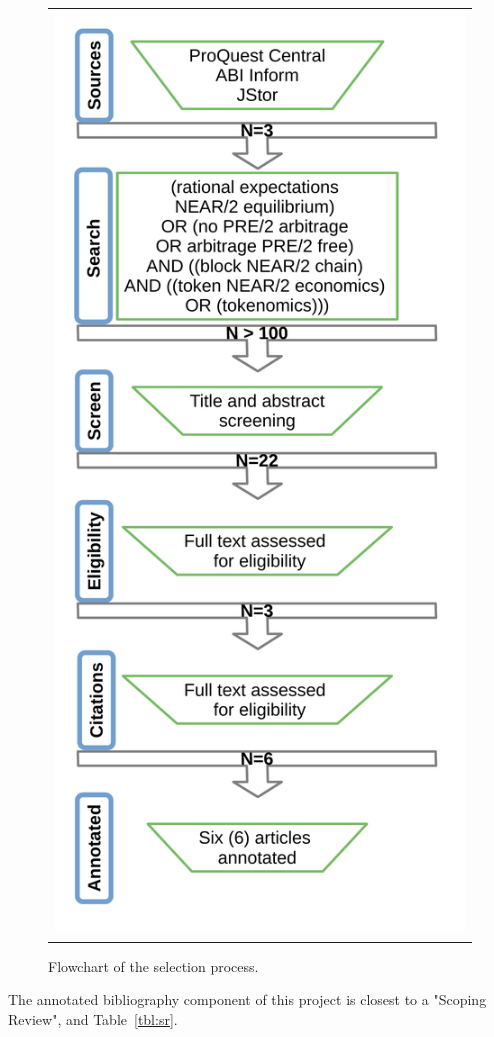 \documentclass[11pt]{article}
\begin{document}
\begin{figure}[!ht]
   \centering
   \begin{tabular}{c}
       \includegraphics[page=1,width=.5\textwidth]{flowchart} 
   \end{tabular}
 \caption{Flowchart of the selection process.}
 \label{fig:flowchart}
\end{figure}

The annotated bibliography component of this project is closest to a "Scoping Review"\autocite{grant09}, and Table~\ref{tbl:sr}.
\end{document}
